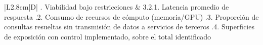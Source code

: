 \begin{table}[H]
{\begin{tabular}{|L{2.8cm}|D|}
{. Viabilidad bajo restricciones
 & 3.2.1. Latencia promedio de respuesta .2. Consumo de recursos de cómputo (memoria/GPU) .3. Proporción de consultas resueltas sin transmisión de datos a servicios de terceros .4. Superficies de exposición con control implementado, sobre el total identificado} \\
\hline
\end{tabular}\par}
\vspace{0.15cm}
\end{table}
